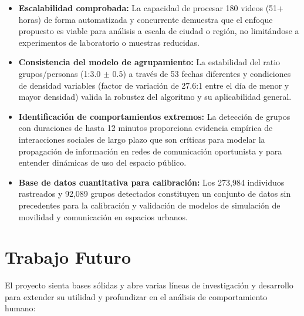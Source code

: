 \begin{itemize}
	\item \textbf{Escalabilidad comprobada:} La capacidad de procesar 180 videos (51+ horas) de forma automatizada y concurrente demuestra que el enfoque propuesto es viable para análisis a escala de ciudad o región, no limitándose a experimentos de laboratorio o muestras reducidas.
	
	\item \textbf{Consistencia del modelo de agrupamiento:} La estabilidad del ratio grupos/personas (1:3.0 $\pm$ 0.5) a través de 53 fechas diferentes y condiciones de densidad variables (factor de variación de 27.6:1 entre el día de menor y mayor densidad) valida la robustez del algoritmo y su aplicabilidad general.
	
	\item \textbf{Identificación de comportamientos extremos:} La detección de grupos con duraciones de hasta 12 minutos proporciona evidencia empírica de interacciones sociales de largo plazo que son críticas para modelar la propagación de información en redes de comunicación oportunista y para entender dinámicas de uso del espacio público.
	
	\item \textbf{Base de datos cuantitativa para calibración:} Los 273,984 individuos rastreados y 92,089 grupos detectados constituyen un conjunto de datos sin precedentes para la calibración y validación de modelos de simulación de movilidad y comunicación en espacios urbanos.
\end{itemize}

\section{Trabajo Futuro}
El proyecto sienta bases sólidas y abre varias líneas de investigación y desarrollo para extender su utilidad y profundizar en el análisis de comportamiento humano:

